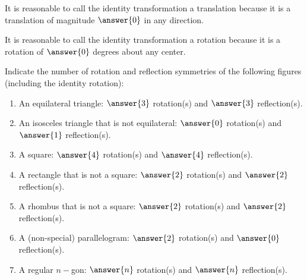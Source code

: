 \documentclass[nooutcomes]{ximera}
\begin{document}
\begin{question}
It is reasonable to call the identity transformation a translation because it is a translation of magnitude $\answer{0}$ in any direction.  

It is reasonable to call the identity transformation a rotation because it is a rotation of $\answer{0}$ degrees about any center.  
\end{question}

\begin{question}
Indicate the number of rotation and reflection symmetries of the following figures (including the identity rotation): 
\begin{enumerate}
\item An equilateral triangle: $\answer{3}$ rotation(s) and $\answer{3}$ reflection(s). 
\item An isosceles triangle that is not equilateral: $\answer{0}$ rotation(s) and $\answer{1}$ reflection(s).
\item A square: $\answer{4}$ rotation(s) and $\answer{4}$ reflection(s).
\item A rectangle that is not a square: $\answer{2}$ rotation(s) and $\answer{2}$ reflection(s).
\item A rhombus that is not a square: $\answer{2}$ rotation(s) and $\answer{2}$ reflection(s).
\item A (non-special) parallelogram: $\answer{2}$ rotation(s) and $\answer{0}$ reflection(s).
\item A regular $n-$gon: $\answer{n}$ rotation(s) and $\answer{n}$ reflection(s).
\end{enumerate}
\end{question}

\end{document}
